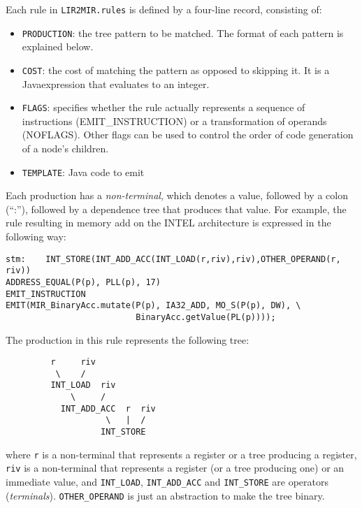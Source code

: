 Each rule in {\tt LIR2MIR.rules} is defined by a four-line record,
consisting of:
\begin{itemize}
\item {\tt PRODUCTION}: the tree pattern to be matched.  The format of each
pattern is explained below.
\item {\tt COST}: the cost of matching the pattern as opposed to skipping
it.  It is a Java\trademark expression that evaluates to an integer.
\item {\tt FLAGS}: specifies whether the rule actually represents a sequence
of instructions (EMIT\_INSTRUCTION) or a transformation of operands
(NOFLAGS). Other flags can be used to control the order of code
generation of a node's children.
\item {\tt TEMPLATE}: Java code to emit
\end{itemize}

Each production has a {\em non-terminal}, which denotes a value, followed
by a colon (``:''), followed by a dependence tree that produces that value.
For example, the rule resulting in memory add on the INTEL architecture is
expressed in the following way:
\begin{verbatim}
stm:    INT_STORE(INT_ADD_ACC(INT_LOAD(r,riv),riv),OTHER_OPERAND(r, riv))
ADDRESS_EQUAL(P(p), PLL(p), 17)
EMIT_INSTRUCTION
EMIT(MIR_BinaryAcc.mutate(P(p), IA32_ADD, MO_S(P(p), DW), \
                          BinaryAcc.getValue(PL(p))));
\end{verbatim}
The production in this rule represents the following tree:
\begin{verbatim}
         r     riv
          \    /
         INT_LOAD  riv
             \     /
           INT_ADD_ACC  r  riv
                    \   |  /
                   INT_STORE
\end{verbatim}
where {\tt r} is a non-terminal that represents a register or a tree
producing a register, {\tt riv} is a non-terminal that represents a register
(or a tree producing one) or an immediate value, and {\tt INT\_LOAD},
{\tt INT\_ADD\_ACC} and {\tt INT\_STORE} are operators ({\em terminals}).
{\tt OTHER\_OPERAND} is just an abstraction to make the tree binary.

